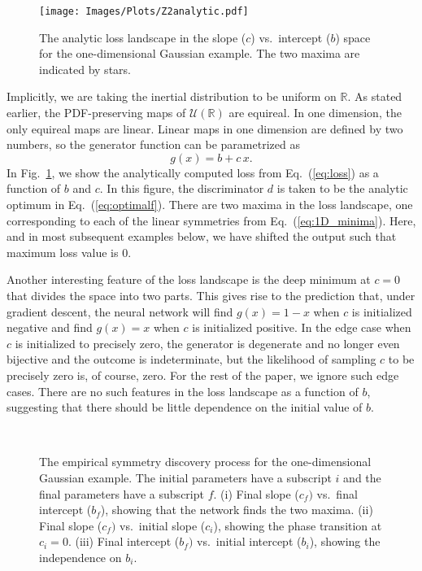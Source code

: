 \documentclass[aps,prx,reprint,preprintnumbers,superscriptaddress,nofootinbib,longbibliography,floatfix]{revtex4-1}
\newcommand{\R}{\mathbb{R}}
\newcommand{\U}{\mathcal{U}}
\DeclareRobustCommand{\Fig}[1]{Fig.~\ref{fig:#1}}
\DeclareRobustCommand{\Eq}[1]{Eq.~(\ref{eq:#1})}
\begin{document}
\begin{figure}[t]
    \centering
    \texttt{[image: Images/Plots/Z2analytic.pdf]}
    \caption{
    The analytic loss landscape in the slope ($c$) vs.\ intercept ($b$) space for the one-dimensional Gaussian example.
    The two maxima are indicated by stars.}
    \label{fig:Z2analytic}
\end{figure}


Implicitly, we are taking the inertial distribution to be uniform on $\mathbb{R}$.
%
As stated earlier, the PDF-preserving maps of $\U(\R)$ are equireal.
%
In one dimension, the only equireal maps are linear.
%
Linear maps in one dimension are defined by two numbers, so the generator function can be parametrized as
%
\begin{equation}
    \label{eq:linear_form}
    g(x) = b + c \, x. 
\end{equation}
%
In \Fig{Z2analytic}, we show the analytically computed loss from \Eq{loss} as a function of $b$ and $c$.
%
In this figure, the discriminator $d$ is taken to be the analytic optimum in \Eq{optimalf}.
%
There are two maxima in the loss landscape, one corresponding to each of the linear symmetries from \Eq{1D_minima}.
%
Here, and in most subsequent examples below, we have shifted the output such that maximum loss value is $0$.


Another interesting feature of the loss landscape is the deep minimum at $c=0$ that divides the space into two parts.
%
This gives rise to the prediction that, under gradient descent, the neural network will find $g(x)= 1-x$ when $c$ is initialized negative and find $g(x) = x$ when $c$ is initialized positive.
%
In the edge case when $c$ is initialized to precisely zero, the generator is degenerate and no longer even bijective and the outcome is indeterminate, but the likelihood of sampling $c$ to be precisely zero is, of course, zero.
%
For the rest of the paper, we ignore such edge cases.
%
There are no such features in the loss landscape as a function of  $b$, suggesting that there should be little dependence on the initial value of $b$.

\begin{figure*}[t]
    \centering
    $\quad$
    $\quad$
    \caption{
    The empirical symmetry discovery process for the one-dimensional Gaussian example.
    The initial parameters have a subscript $i$ and the final parameters have a subscript $f$.
    (i) Final slope ($c_f)$ vs.\ final intercept ($b_f$), showing that the network finds the two maxima.
    (ii) Final slope ($c_f)$ vs.\ initial slope ($c_i$), showing the phase transition at $c_i = 0$.
    (iii) Final intercept ($b_f)$ vs.\ initial intercept ($b_i$), showing the independence on $b_i$.}
    \label{fig:Z2numeric}
\end{figure*}
\end{document}
